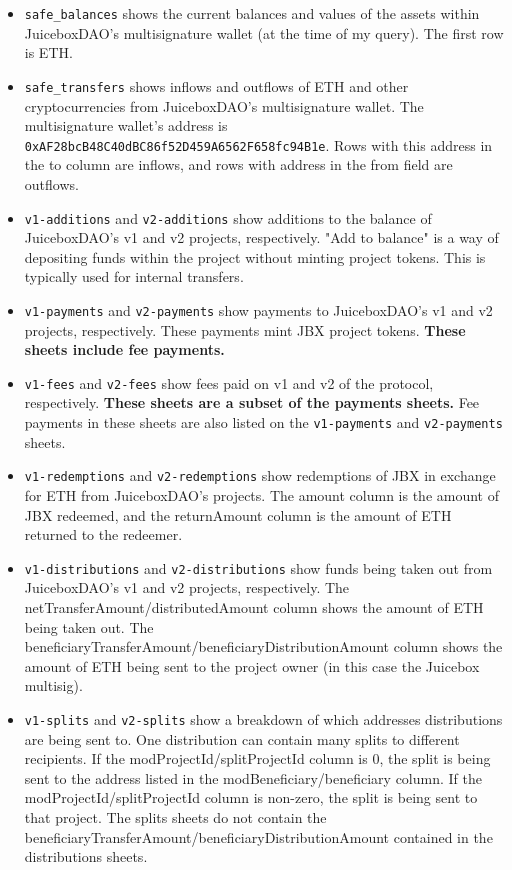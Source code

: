 \documentclass{article}
\begin{document}
\begin{itemize}
\item \texttt{safe\_balances} shows the current balances and values of the assets within JuiceboxDAO's multisignature wallet (at the time of my query). The first row is ETH.
\item \texttt{safe\_transfers} shows inflows and outflows of ETH and other cryptocurrencies from JuiceboxDAO's multisignature wallet. The multisignature wallet's address is \texttt{0xAF28bcB48C40dBC86f52D459A6562F658fc94B1e}. Rows with this address in the to column are inflows, and rows with address in the from field are outflows.
\item \texttt{v1-additions} and \texttt{v2-additions} show additions to the balance of JuiceboxDAO's v1 and v2 projects, respectively. "Add to balance" is a way of depositing funds within the project without minting project tokens. This is typically used for internal transfers.
\item \texttt{v1-payments} and \texttt{v2-payments} show payments to JuiceboxDAO's v1 and v2 projects, respectively. These payments mint JBX project tokens. \textbf{These sheets include fee payments.}
\item \texttt{v1-fees} and \texttt{v2-fees} show fees paid on v1 and v2 of the protocol, respectively. \textbf{These sheets are a subset of the payments sheets.} Fee payments in these sheets are also listed on the \texttt{v1-payments} and \texttt{v2-payments} sheets.
\item \texttt{v1-redemptions} and \texttt{v2-redemptions} show redemptions of JBX in exchange for ETH from JuiceboxDAO's projects. The amount column is the amount of JBX redeemed, and the returnAmount column is the amount of ETH returned to the redeemer.
\item \texttt{v1-distributions} and \texttt{v2-distributions} show funds being taken out from JuiceboxDAO's v1 and v2 projects, respectively. The netTransferAmount/distributedAmount column shows the amount of ETH being taken out. The beneficiaryTransferAmount/beneficiaryDistributionAmount column shows the amount of ETH being sent to the project owner (in this case the Juicebox multisig).
\item \texttt{v1-splits} and \texttt{v2-splits} show a breakdown of which addresses distributions are being sent to. One distribution can contain many splits to different recipients. If the modProjectId/splitProjectId column is 0, the split is being sent to the address listed in the modBeneficiary/beneficiary column. If the modProjectId/splitProjectId column is non-zero, the split is being sent to that project. The splits sheets do not contain the beneficiaryTransferAmount/beneficiaryDistributionAmount contained in the distributions sheets.
\end{itemize}
\end{document}
